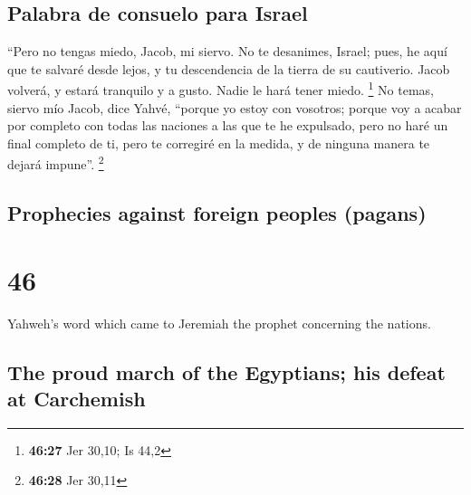 \begin{paracol}{2}
\hypertarget{palabra-de-consuelo-para-israel}{%
\subsection{Palabra de consuelo para
Israel}\label{palabra-de-consuelo-para-israel}}

 ``Pero no tengas miedo, Jacob, mi siervo. No te
desanimes, Israel; pues, he aquí que te salvaré desde lejos, y tu
descendencia de la tierra de su cautiverio. Jacob volverá, y estará
tranquilo y a gusto. Nadie le hará tener miedo. \footnote{\textbf{46:27}
  Jer 30,10; Is 44,2}  No temas, siervo mío Jacob, dice
Yahvé, ``porque yo estoy con vosotros; porque voy a acabar por completo
con todas las naciones a las que te he expulsado, pero no haré un final
completo de ti, pero te corregiré en la medida, y de ninguna manera te
dejará impune''. \footnote{\textbf{46:28} Jer 30,11}

\switchcolumn
\begin{otherlanguage}{english}

\hypertarget{prophecies-against-foreign-peoples-pagans}{%
\subsection{Prophecies against foreign peoples
(pagans)}\label{prophecies-against-foreign-peoples-pagans}}

\hypertarget{section-91}{%
\section{46}\label{section-91}}

 Yahweh's word which came to Jeremiah the prophet
concerning the nations.

\hypertarget{the-proud-march-of-the-egyptians-his-defeat-at-carchemish}{%
\subsection{The proud march of the Egyptians; his defeat at
Carchemish}\label{the-proud-march-of-the-egyptians-his-defeat-at-carchemish}}


\end{otherlanguage}
\end{paracol}
